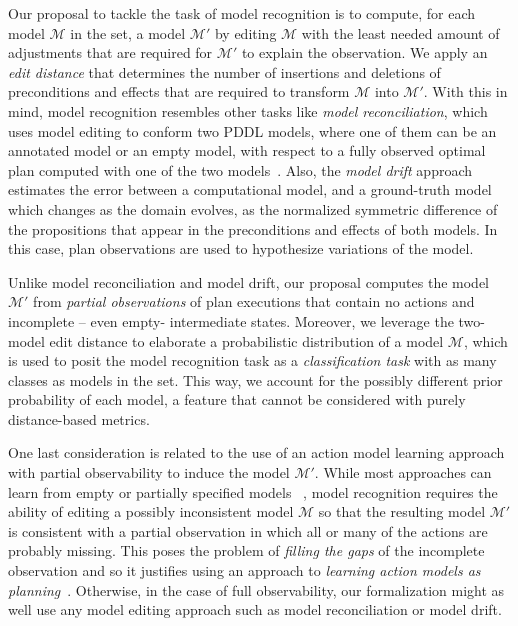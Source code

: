 \documentclass[letterpaper]{article} %
\begin{document}
Our proposal to tackle the task of model recognition is to compute, for each model $\mathcal{M}$ in the set, a model $\mathcal{M'}$ by editing $\mathcal{M}$ with the least needed amount of adjustments that are required for $\mathcal{M'}$ to explain the observation. We apply an \emph{edit distance} that determines the number of insertions and deletions of preconditions and effects that are required to transform $\mathcal{M}$ into $\mathcal{M'}$. With this in mind, model recognition resembles other tasks like \emph{model reconciliation}, which uses model editing to conform two PDDL models, where one of them can be an annotated model or an empty model, with respect to a fully observed optimal plan computed with one of the two models~\cite{ChakrabortiSZK17,sreedharan2018handling,Chakraborti18}. Also, the \emph{model drift} approach estimates the error between a computational model, and a ground-truth model which changes as the domain evolves, as the normalized symmetric difference of the propositions that appear in the preconditions and effects of both models. In this case, plan observations are used to hypothesize variations of the model.


Unlike model reconciliation and model drift, our proposal computes the model $\mathcal{M'}$ from \emph{partial observations} of plan executions that contain no actions and incomplete -- even empty- intermediate states. Moreover, we leverage the two-model edit distance to elaborate a probabilistic distribution of a model $\mathcal{M}$, which is used to posit the model recognition task as a \emph{classification task} with as many classes as models in the set. This way, we account for the possibly different prior probability of each model, a feature that cannot be considered with purely distance-based metrics.


One last consideration is related to the use of an action model learning approach with partial observability to induce the model $\mathcal{M'}$. While most approaches can learn from empty or partially specified models ~\cite{yang2007learning,AmirC08,cresswell2013acquiring}, model recognition requires the ability of editing a possibly inconsistent model $\mathcal{M}$ so that the resulting model $\mathcal{M'}$ is consistent with a partial observation in which all or many of the actions are probably missing. This poses the problem of \emph{filling the gaps} of the incomplete observation and so it justifies using an approach to \emph{learning action models as planning}~\cite{aineto2018learning}. Otherwise, in the case of full observability, our formalization might as well use any model editing approach such as model reconciliation or model drift.
\end{document}
